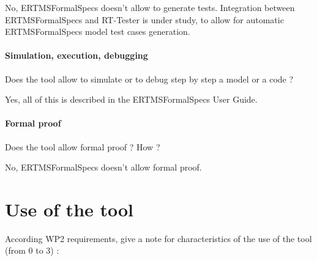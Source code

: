 \begin{author_comment}
No, ERTMSFormalSpecs doesn't allow to generate tests. Integration between ERTMSFormalSpecs and RT-Tester is under study, to allow for automatic ERTMSFormalSpecs model test cases generation.
\end{author_comment}

\paragraph{Simulation, execution, debugging}
Does the tool allow to simulate or to debug step by step a model or a code ?

\begin{author_comment}
Yes, all of this is described in the ERTMSFormalSpecs User Guide.
\end{author_comment}

\paragraph{Formal proof}
Does the tool allow formal proof ?  How ?

\begin{author_comment}
No, ERTMSFormalSpecs doesn't allow formal proof. 
\end{author_comment}

\section{Use of the tool}

According WP2 requirements, give a note for characteristics of the use of the tool (from 0 to 3) :

